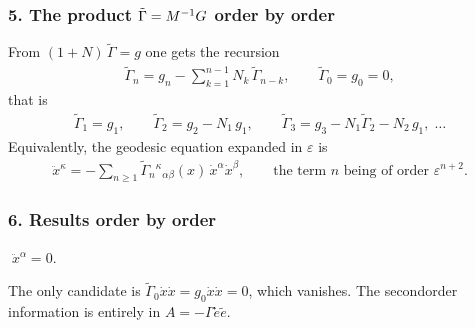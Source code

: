 \documentclass[letterpaper,10pt,english]{jupyterBook}
\begin{document}
\subsubsection{5. The product \protect\(\tilde\Gamma=M^{-1}G\protect\) order by order}
\label{\detokenize{ch/relativity-general/geodesics-linearization:the-product-tilde-gamma-m-1-g-order-by-order}}
\sphinxAtStartPar
From \((1+N)\,\tilde\Gamma=g\) one gets the recursion
\begin{equation*}
\begin{split}
\tilde\Gamma_n=g_n-\sum_{k=1}^{n-1}N_k\,\tilde\Gamma_{n-k},\qquad \tilde\Gamma_0=g_0=0,
\end{split}
\end{equation*}
\sphinxAtStartPar
that is
\begin{equation*}
\begin{split}
\tilde\Gamma_1=g_1,\qquad
\tilde\Gamma_2=g_2-N_1\,g_1,\qquad
\tilde\Gamma_3=g_3-N_1\tilde\Gamma_2-N_2\,g_1,\;\dots
\end{split}
\end{equation*}
\sphinxAtStartPar
Equivalently, the geodesic equation expanded in \(\varepsilon\) is
\begin{equation*}
\begin{split}
\ddot x^\kappa=-\sum_{n\ge1}\tilde\Gamma_n{}^\kappa{}_{\alpha\beta}(x)\,\dot x^\alpha\dot x^\beta ,\qquad
\text{the term }n\text{ being of order }\varepsilon^{n+2}.
\end{split}
\end{equation*}

\subsubsection{6. Results order by order}
\label{\detokenize{ch/relativity-general/geodesics-linearization:results-order-by-order}}
\sphinxAtStartPar
{} \(\;\ddot x^\alpha=0\).

\sphinxAtStartPar
{} The only candidate is \(\tilde\Gamma_0\dot x\dot x=g_0\dot x\dot x=0\), which vanishes. The second\sphinxhyphen{}order information is entirely in \(A=-\Gamma\tilde e\tilde e\).
\end{document}
